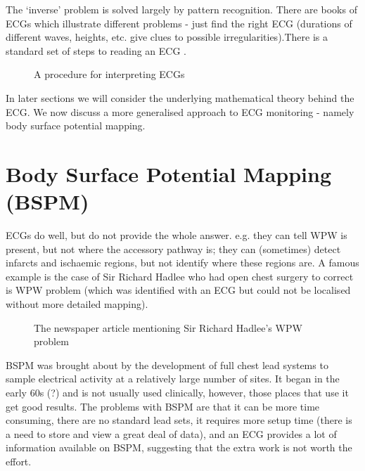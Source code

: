 The `inverse' problem is solved largely by pattern recognition.  There are
books of ECGs which illustrate different problems - just find the right ECG
(durations of different waves, heights, etc. give clues to possible
irregularities).There is a standard set of steps to reading an ECG .

\begin{figure}[htbp] \centering
  \caption[ECG Interpretation]{A procedure for interpreting ECGs}
  \label{fig:ecg-interpretation}
\end{figure}

In later sections we will consider the underlying mathematical theory behind
the ECG.  We now discuss a more generalised approach to ECG monitoring -
namely body surface potential mapping.

\section{Body Surface Potential Mapping (BSPM)}
ECGs do well, but do not provide the whole answer. e.g. they can tell WPW is
present, but not where the accessory pathway is; they can (sometimes) detect
infarcts and ischaemic regions, but not identify where these regions are. A
famous example is the case of Sir Richard Hadlee  
who had open chest surgery to
correct is WPW problem (which was identified with an ECG but could not be
localised without more detailed mapping).

\begin{figure}[htbp] \centering
  \caption[Sir Richard Hadlee]{The newspaper article
    mentioning Sir Richard Hadlee's WPW problem}
  \label{fig:hadley}
\end{figure}

BSPM was brought about by the development of full chest lead systems
to sample electrical activity at a relatively large number of sites. It began
in the early 60s (?) and is not usually used clinically, however, those places
that use it get good results.  The problems with BSPM are that
it can be more time consuming, there are no standard lead sets, it requires more
setup time (there is a need to store and view a great deal of data), and an
ECG provides a lot of information available on BSPM, suggesting that the extra
work is not worth the effort. 

